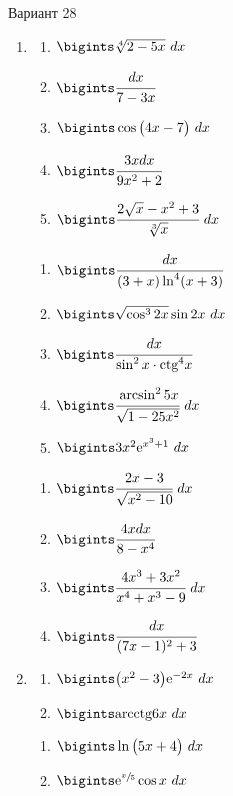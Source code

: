 \documentclass{article}
\begin{document}
\begin{multicols}{2}
	\centerline{Вариант 28}
	\begin{enumerate}[label=\Roman*.]
		\item
		\begin{multicols}{3}
			\begin{enumerate}[label=\arabic*.]
				\setlength\itemsep{1em}
				\item $\bigints\sqrt[4]{2-5x}\ dx$
				\item $\bigints\cfrac{dx}{7-3x}$
				\item $\bigints\cos \big( 4x-7 \big)\ dx$
				\item $\bigints\cfrac{3xdx}{9x^2+2}$
				\item $\bigints\cfrac{2\sqrt{x} - x^2+3}{\sqrt[3]{x}}\ dx$
			\end{enumerate}
			\vfill\null\columnbreak
			\begin{enumerate}[label=\arabic*. , start=6]
				\setlength\itemsep{1em}
				\item $\bigints\cfrac{dx}{(3 + x)\ln^4(x+3)}$
				\item $\bigints\sqrt{\cos^32x}\sin 2x\ dx$
				\item $\bigints\cfrac{dx}{\sin^2x \cdot \mbox{ctg}^4x}$
				\item $\bigints\cfrac{\arcsin^2 5x}{\sqrt{1-25 x^2}}\ dx$
				\item $\bigints 3x^2\mbox{e}^{x^3 + 1}\ dx$
			\end{enumerate}
			\vfill\null\columnbreak
			\begin{enumerate}[label=\arabic*. , start=11]
				\setlength\itemsep{1em}
				\item $\bigints\cfrac{2x - 3}{\sqrt{x^2 - 10}}\ dx$
				\item $\bigints\cfrac{4xdx}{8-x^4}$
				\item $\bigints\cfrac{4x^3 + 3x^2}{x^4 + x^3 - 9}\ dx$
				\item $\bigints\cfrac{dx}{(7x - 1)^2 + 3}$
			\end{enumerate}
			\vfill\null\columnbreak
		\end{multicols}
		
		\item
		\begin{multicols}{3}
			\begin{enumerate}[label=\arabic*.]
				\setlength\itemsep{1em}
				\item $\bigints\big(x^2 - 3\big)\mbox{e}^{-2x}\ dx$
				\item $\bigints\mbox{arcctg}6x\ dx$
			\end{enumerate}
			\vfill\null\columnbreak
			\begin{enumerate}[label=\arabic*., start=3]
				\setlength\itemsep{1em}
				\item $\bigints\ln\big(5x + 4\big)\ dx$
				\item $\bigints\mbox{e}^{\sfrac{x}{5}}\cos x\ dx$
			\end{enumerate}
			\vfill\null\columnbreak
			\vfill\null\columnbreak
		\end{multicols}
		

\end{enumerate}
\end{multicols}
\end{document}
